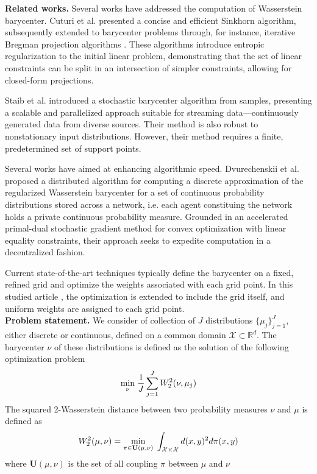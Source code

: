 \textbf{Related works.}  Several works have addressed the computation of Wasserstein barycenter. Cuturi et al. \cite{cuturi_sinkhorn_2013} presented a concise and efficient Sinkhorn algorithm, subsequently extended to barycenter problems through, for instance, iterative Bregman projection algorithms \cite{benamou_iterative_2014}. These algorithms introduce entropic regularization to the initial linear problem, demonstrating that the set of linear constraints can be split in an intersection of simpler constraints, allowing for closed-form projections.

Staib et al. \cite{staib_parallel_2017} introduced a stochastic barycenter algorithm from samples, presenting a scalable and parallelized approach suitable for streaming data—continuously generated data from diverse sources. Their method is also robust to nonstationary input distributions. However, their method requires a finite, predetermined set of support points. 

Several works have aimed at enhancing algorithmic speed. Dvurechenskii et al. \cite{dvurechenskii_decentralize_2018} proposed a distributed algorithm for computing a discrete approximation of the regularized Wasserstein barycenter for a set of continuous probability distributions stored across a network, i.e. each agent constituing the network holds a private continuous probability measure. Grounded in an accelerated primal-dual stochastic gradient method for convex optimization with linear equality constraints, their approach seeks to expedite computation in a decentralized fashion.

Current state-of-the-art techniques typically define the barycenter on a fixed, refined grid and optimize the weights associated with each grid point. In this studied article \cite{claici_stochastic_2018}, the optimization is extended to include the grid itself, and uniform weights are assigned to each grid point. \\ 

\textbf{Problem statement.} We consider of collection of $J$ distributions $\lbrace \mu_j \rbrace_{j=1}^J$, either discrete or continuous, defined on a common domain $\mathcal{X} \subset \mathbb{R}^d$. The barycenter $\nu$ of these distributions is defined as the solution of the following optimization problem 
\begin{equation}\label{eq:primal}
      \underset{\nu}{\min}\;\frac{1}{J}\sum_{j=1}^{J} W_2^2(\nu, \mu_j)
\end{equation}
The squared 2-Wasserstein distance between two probability measures $\nu$ and $\mu$ is defined as
\begin{equation}\label{eq:W2}
     W_2^2(\mu, \nu) = \underset{\pi \in \textbf{U}(\mu, \nu)}{\min}\; \int_{\mathcal{X}\times\mathcal{X}} d(x, y)^2 d\pi(x, y)
\end{equation}
where $\textbf{U}(\mu, \nu)$ is the set of all coupling $\pi$ between $\mu$ and $\nu$

